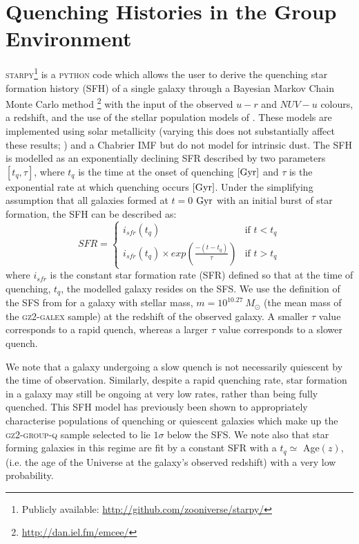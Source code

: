\documentclass[useAMS,usenatbib]{mn2e}
\begin{document}
\section{Quenching Histories in the Group Environment}\label{sec:starpy}

\textsc{starpy}\footnote{Publicly available: \url{http://github.com/zooniverse/starpy/}} is a \textsc{python} code which allows the user to derive the quenching star formation history (SFH) of a single galaxy through a Bayesian Markov Chain Monte Carlo method \citep{emcee13}\footnote{\url{http://dan.iel.fm/emcee/}} with the input of the observed $u-r$ and $NUV-u$ colours, a redshift, and the use of the stellar population models of \cite{BC03}. These models are implemented using solar metallicity (varying this does not substantially affect these results; \citealt{smethurst15}) and a Chabrier IMF \citep{chabrier03} but do not model for intrinsic dust. The SFH is modelled as an exponentially declining SFR described by two parameters $[t_{q}, \tau]$, where $t_{q}$ is the time at the onset of quenching $\rm{[Gyr]}$ and $\tau$ is the exponential rate at which quenching occurs $\rm{[Gyr]}$. Under the simplifying assumption that all galaxies formed at $t=0$ $\rm{ Gyr}$ with an initial burst of star formation, the SFH can be described as: 
\begin{equation}\label{sfh}
SFR =
\begin{cases}
i_{sfr}(t_{q}) & \text{if } t < t_{q} \\
i_{sfr}(t_{q}) \times exp{\left( \frac{-(t-t_{q})}{\tau}\right)} & \text{if } t > t_{q} 
\end{cases}
\end{equation}
where $i_{sfr}$ is the constant star formation rate (SFR) defined so that at the time of quenching, $t_{q}$, the modelled galaxy resides on the SFS. We use the definition of the SFS from \cite{peng10} for a galaxy with stellar mass, $m = 10^{10.27}~M_{\odot}$ (the mean mass of the \textsc{gz2-galex} sample) at the redshift of the observed galaxy.  A smaller $\tau$ value corresponds to a rapid quench, whereas a larger $\tau$ value corresponds to a slower quench. 

We note that a galaxy undergoing a slow quench is not necessarily quiescent by the time of observation. Similarly, despite a rapid quenching rate, star formation in a galaxy may still be ongoing at very low rates, rather than being fully quenched. This SFH model has previously been shown to appropriately characterise populations of quenching or quiescent galaxies \citep{Weiner06, Martin07, Noeske07,schawinski14} which make up the \textsc{gz2-group-q} sample selected to lie $1\sigma$ below the SFS. We note also that star forming galaxies in this regime are fit by a constant SFR with a $t_{q} \simeq$ Age$(z)$, (i.e. the age of the Universe at the galaxy's observed redshift) with a very low probability.
\end{document}
